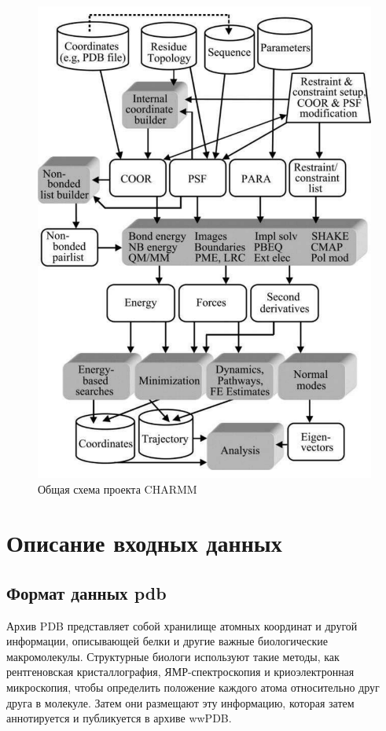 \begin{figure}
\begin{center}
	\includegraphics[width=1.0\textwidth]{images/charmm.pdf}
	\caption{Общая схема проекта CHARMM}
    \label{charmm}
\end{center}
\end{figure}


\section{Описание входных данных}


\subsection{Формат данных pdb}

Архив PDB представляет собой хранилище атомных координат и другой информации, описывающей белки и другие важные биологические макромолекулы. Структурные биологи используют такие методы, как рентгеновская кристаллография, ЯМР-спектроскопия и криоэлектронная микроскопия, чтобы определить положение каждого атома относительно друг друга в молекуле. Затем они размещают эту информацию, которая затем аннотируется и публикуется в архиве wwPDB.

